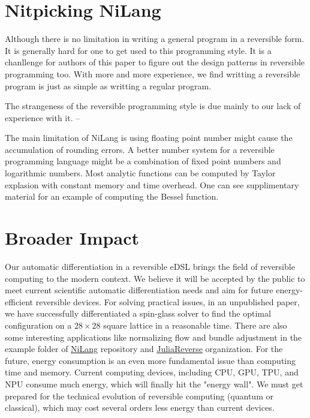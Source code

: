 \documentclass{article}
\newcommand{\<}{\langle}
\renewcommand{\>}{\rangle}
\theoremstyle{definition}\newtheorem{definition}{\textit{Definition}}
\begin{document}

\section{Nitpicking NiLang}
Although there is no limitation in writing a general program in a reversible form. It is generally hard for one to get used to this programming style.
It is a chanllenge for authors of this paper to figure out the design patterns in reversible programming too.
With more and more experience, we find writting a reversible program is just as simple as writting a regular program.
\begin{quoting}
The strangeness of the reversible programming style is due mainly to our lack of experience with it. -- ~\cite{Baker1992}
\end{quoting}
The main limitation of NiLang is using floating point number might cause the accumulation of rounding errors.
A better number system for a reversible programming language might be a combination of fixed point numbers and logarithmic numbers.
Most analytic functions can be computed by Taylor explasion with constant memory and time overhead. One can see supplimentary material for an example of computing the Bessel function.

\section*{Broader Impact}
Our automatic differentiation in a reversible eDSL brings the field of reversible computing to the modern context. We believe it will be accepted by the public to meet current scientific automatic differentiation needs and aim for future energy-efficient reversible devices.
For solving practical issues, in an unpublished paper, we have successfully differentiated a spin-glass solver to find the optimal configuration on a $28\times 28$ square lattice in a reasonable time. There are also some interesting applications like normalizing flow and bundle adjustment in the example folder of \href{https://github.com/GiggleLiu/NiLang.jl}{NiLang} repository and \href{https://github.com/JuliaReverse}{JuliaReverse} organization.
For the future, energy consumption is an even more fundamental issue than computing time and memory. Current computing devices, including CPU, GPU, TPU, and NPU consume much energy, which will finally hit the "energy wall". We must get prepared for the technical evolution of reversible computing (quantum or classical), which may cost several orders less energy than current devices.
\end{document}

